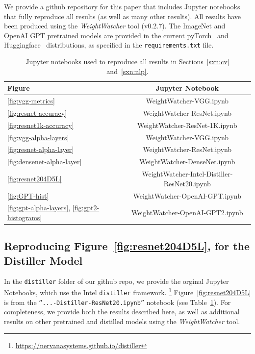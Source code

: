 We provide a github repository for this paper that includes Jupyter notebooks that fully reproduce all results (as well as many other results).
All results have been produced using the \emph{WeightWatcher} tool (v0.2.7).
The ImageNet and OpenAI GPT pretrained models are provided in the current 
pyTorch~\cite{pytorch} and Huggingface~\cite{huggingface} distributions, as specified in the \texttt{requirements.txt} file. 

\begin{table}[t]
\small
\begin{center}
\begin{tabular}{|p{1in}|c|}
\hline
Figure & Jupyter Notebook \\
\hline
\ref{fig:vgg-metrics}                                 & WeightWatcher-VGG.ipynb \\
\ref{fig:resnet-accuracy}                             & WeightWatcher-ResNet.ipynb \\
\ref{fig:resnet1k-accuracy}                           & WeightWatcher-ResNet-1K.ipynb \\
\ref{fig:vgg-alpha-layers}                            & WeightWatcher-VGG.ipynb \\
\ref{fig:resnet-alpha-layer}                          & WeightWatcher-ResNet.ipynb \\
\ref{fig:densenet-alpha-layer}                        & WeightWatcher-DenseNet.ipynb \\
\hline
\ref{fig:resnet204D5L}                                & WeightWatcher-Intel-Distiller-ResNet20.ipynb \\
\hline
\ref{fig:GPT-hist}                                    & WeightWatcher-OpenAI-GPT.ipynb \\
\ref{fig:gpt-alpha-layers}, \ref{fig:gpt2-histograms} & WeightWatcher-OpenAI-GPT2.ipynb \\
\hline
\end{tabular}
\end{center}
\caption{Jupyter notebooks used to reproduce all results in Sections~\ref{sxn:cv} and~\ref{sxn:nlp}.}
\label{table:notebooks}
\end{table}


\subsection{Reproducing Figure~\ref{fig:resnet204D5L}, for the Distiller Model}

In the \texttt{distiller} folder of our github repo, 
we provide the orginal Jupyter Notebooks, which use the Intel \texttt{distiller} framework.%
\footnote{\url{https://nervanasystems.github.io/distiller}} 
Figure~\ref{fig:resnet204D5L} is from the  \texttt{``...-Distiller-ResNet20.ipynb''} notebook (see Table~\ref{table:notebooks}).  
For completeness, we provide both the results described here, as well as additional results on other pretrained and distilled models using the \emph{WeightWatcher} tool.


